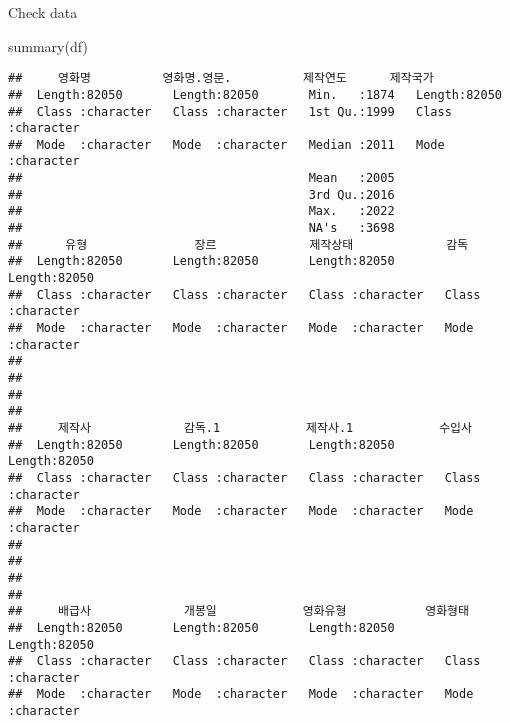 \documentclass[
]{article}
\newenvironment{Shaded}{\begin{snugshade}}{\end{snugshade}}
\newcommand{\FunctionTok}[1]{\textcolor[rgb]{0.00,0.00,0.00}{#1}}
\newcommand{\NormalTok}[1]{#1}
\begin{document}
Check data

\begin{Shaded}
\begin{Highlighting}[]
\FunctionTok{summary}\NormalTok{(df)}
\end{Highlighting}
\end{Shaded}

\begin{verbatim}
##     영화명          영화명.영문.          제작연도      제작국가        
##  Length:82050       Length:82050       Min.   :1874   Length:82050      
##  Class :character   Class :character   1st Qu.:1999   Class :character  
##  Mode  :character   Mode  :character   Median :2011   Mode  :character  
##                                        Mean   :2005                     
##                                        3rd Qu.:2016                     
##                                        Max.   :2022                     
##                                        NA's   :3698                     
##      유형               장르             제작상태             감독          
##  Length:82050       Length:82050       Length:82050       Length:82050      
##  Class :character   Class :character   Class :character   Class :character  
##  Mode  :character   Mode  :character   Mode  :character   Mode  :character  
##                                                                             
##                                                                             
##                                                                             
##                                                                             
##     제작사             감독.1            제작사.1            수입사         
##  Length:82050       Length:82050       Length:82050       Length:82050      
##  Class :character   Class :character   Class :character   Class :character  
##  Mode  :character   Mode  :character   Mode  :character   Mode  :character  
##                                                                             
##                                                                             
##                                                                             
##                                                                             
##     배급사             개봉일            영화유형           영화형태        
##  Length:82050       Length:82050       Length:82050       Length:82050      
##  Class :character   Class :character   Class :character   Class :character  
##  Mode  :character   Mode  :character   Mode  :character   Mode  :character  

\end{verbatim}
\end{document}
